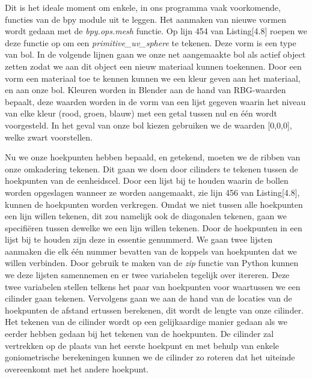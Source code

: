 Dit is het ideale moment om enkele, in ons programma vaak voorkomende, functies van de bpy module uit te leggen. Het aanmaken van nieuwe vormen wordt gedaan met de \textit{bpy.ops.mesh} functie. Op lijn 454 van Listing[4.8] roepen we deze functie op om een \textit{primitive\_uv\_sphere} te tekenen. Deze vorm is een type van bol. In de volgende lijnen gaan we onze net aangemaakte bol als actief object zetten zodat we aan dit object een nieuw materiaal kunnen toekennen. Door een vorm een materiaal toe te kennen kunnen we een kleur geven aan het materiaal, en aan onze bol. Kleuren worden in Blender aan de hand van RBG-waarden bepaalt, deze waarden worden in de vorm van een lijst gegeven waarin het niveau van elke kleur (rood, groen, blauw) met een getal tussen nul en één wordt voorgesteld. In het geval van onze bol kiezen gebruiken we de waarden [0,0,0], welke zwart voorstellen.
\par
Nu we onze hoekpunten hebben bepaald, en getekend, moeten we de ribben van onze omkadering tekenen. Dit gaan we doen door cilinders te tekenen tussen de hoekpunten van de eenheidscel. Door een lijst bij te houden waarin de bollen worden opgeslagen wanneer ze worden aangemaakt, zie lijn 456 van Listing[4.8], kunnen de hoekpunten worden verkregen. Omdat we niet tussen alle hoekpunten een lijn willen tekenen, dit zou namelijk ook de diagonalen tekenen, gaan we specifiëren tussen dewelke we een lijn willen tekenen. Door de hoekpunten in een lijst bij te houden zijn deze in essentie genummerd. We gaan twee lijsten aanmaken die elk één nummer bevatten van de koppels van hoekpunten dat we willen verbinden. Door gebruik te maken van de \textit{zip} functie van Python kunnen we deze lijsten samennemen en er twee variabelen tegelijk over itereren. Deze twee variabelen stellen telkens het paar van hoekpunten voor waartussen we een cilinder gaan tekenen. Vervolgens gaan we aan de hand van de locaties van de hoekpunten de afstand ertussen berekenen, dit wordt de lengte van onze cilinder. Het tekenen van de cilinder wordt op een gelijkaardige manier gedaan als we eerder hebben gedaan bij het tekenen van de hoekpunten. De cilinder zal vertrekken op de plaats van het eerste hoekpunt en met behulp van enkele goniometrische berekeningen kunnen we de cilinder zo roteren dat het uiteinde overeenkomt met het andere hoekpunt.
\par




